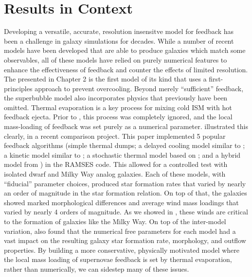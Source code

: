 \section{Results in Context}
Developing a versatile, accurate, resolution insensitve model for feedback has
been a challenge in galaxy simulations for decades.  While a number of recent
models have been developed that are able to produce galaxies which match some
observables, all of these models have relied on purely numerical features to
enhance the effectiveness of feedback and counter the effects of limited
resolution.  The \citet{Keller2014} presented in Chapter 2 is the first model of
its kind that uses a first-principles approach to prevent overcooling.  Beyond
merely ``sufficient'' feedback, the superbubble model also incorporates physics
that previously have been omitted.  Thermal evaporation is a key process for
mixing cold ISM with hot feedback ejecta.  Prior to \citet{Keller2014}, this
process was completely ignored, and the local mass-loading of feedback was set
purely as a numerical parameter.  \citet{Rosdahl2016} illustrated this clearly,
in a recent comparison project.  This paper implemented 5 popular feedback
algorithms (simple thermal dumps; a delayed cooling model similar to
\citet{Agertz2013}; a kinetic model similar to \citet{DallaVecchia2008}; a
stochastic thermal model based on \citet{DallaVecchia2012}; and a hybrid model
from \citet{Kimm2015}) in the {\sc RAMSES} code.  This allowed for a controlled
test with isolated dwarf and Milky Way analog galaxies. Each of these models,
with ``fiducial'' parameter choices, produced star formation rates that varied
by nearly an order of magnitude in the \citet{Kennicutt1998} star formation
relation.  On top of that, the galaxies showed marked morphological differences
and average wind mass loadings that varied by nearly 4 orders of magnitude.  As
we showed in \citet{Keller2015}, these winds are critical to the formation of
galaxies like the Milky Way.  On top of the inter-model variation,
\citet{Rosdahl2016} also found that the numerical free parameters for each model
had a vast impact on the resulting galaxy star formation rate, morphology, and
outflow properties.  By building a more conservative, physically motivated
model where the local mass loading of supernovae feedback is set by thermal
evaporation, rather than numerically, we can sidestep many of these issues.

